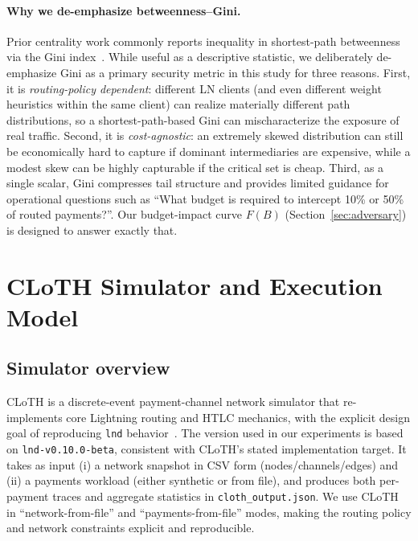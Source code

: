 \documentclass{article}
\begin{document}
\paragraph{Why we de-emphasize betweenness--Gini.}
Prior centrality work commonly reports inequality in shortest-path betweenness via the Gini index~\cite{zabka2024centrality}.
While useful as a descriptive statistic, we deliberately de-emphasize Gini as a primary security metric in this study for three reasons.
First, it is \emph{routing-policy dependent}: different LN clients (and even different weight heuristics within the same client) can realize materially different path distributions, so a shortest-path-based Gini can mischaracterize the exposure of real traffic.
Second, it is \emph{cost-agnostic}: an extremely skewed distribution can still be economically hard to capture if dominant intermediaries are expensive, while a modest skew can be highly capturable if the critical set is cheap.
Third, as a single scalar, Gini compresses tail structure and provides limited guidance for operational questions such as ``What budget is required to intercept 10\% or 50\% of routed payments?''.
Our budget-impact curve $F(B)$ (Section~\ref{sec:adversary}) is designed to answer exactly that.

\section{CLoTH Simulator and Execution Model}
\label{sec:cloth}

\subsection{Simulator overview}
CLoTH is a discrete-event payment-channel network simulator that re-implements core Lightning routing and HTLC mechanics, with the explicit design goal of reproducing \texttt{lnd} behavior~\cite{conoscenti2021cloth}.
The version used in our experiments is based on \texttt{lnd-v0.10.0-beta}, consistent with CLoTH's stated implementation target.
It takes as input (i) a network snapshot in CSV form (nodes/channels/edges) and (ii) a payments workload (either synthetic or from file), and produces both per-payment traces and aggregate statistics in \texttt{cloth\_output.json}.
We use CLoTH in ``network-from-file'' and ``payments-from-file'' modes, making the routing policy and network constraints explicit and reproducible.
\end{document}
